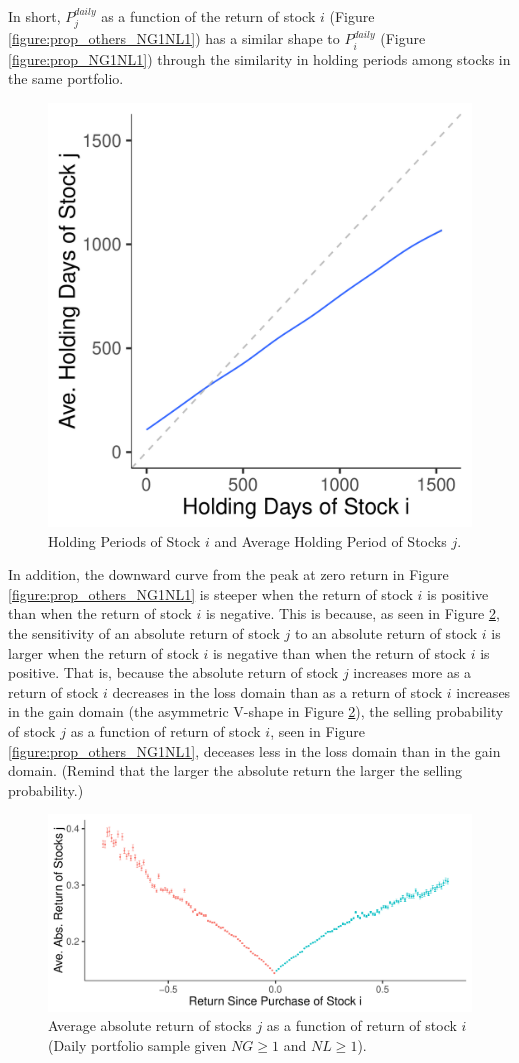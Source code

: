 \documentclass[11pt, a4paper]{article}
\begin{document}
In short, $P^{daily}_{j}$ as a function of the return of stock $i$ (Figure \ref{figure:prop_others_NG1NL1}) has a similar shape to $P^{daily}_{i}$ (Figure \ref{figure:prop_NG1NL1}) through the similarity in holding periods among stocks in the same portfolio. 

\begin{figure}[H]
	\centering
	\includegraphics[width=0.5\columnwidth]{barc_holding_days_i_j_NG1_NL1.pdf}
	\caption{Holding Periods of Stock $i$ and Average Holding Period of Stocks $j$.}
	\label{figure:holding_days_i_j_NG1NL1}
\end{figure}


In addition, the downward curve from the peak at zero return in Figure \ref{figure:prop_others_NG1NL1} is steeper when the return of stock $i$ is positive than when the return of stock $i$ is negative. This is because, as seen in Figure \ref{figure:ret_i_abs_j_NG1NL1}, the sensitivity of an absolute return of stock $j$ to an absolute return of stock $i$ is larger when the return of stock $i$ is negative than when the return of stock $i$ is positive. 
That is, because the absolute return of stock $j$ increases more as a return of stock $i$ decreases in the loss domain than as a return of stock $i$ increases in the gain domain (the asymmetric V-shape in Figure \ref{figure:ret_i_abs_j_NG1NL1}), the selling probability of stock $j$ as a function of return of stock $i$, seen in Figure \ref{figure:prop_others_NG1NL1}, deceases less in the loss domain than in the gain domain.
(Remind that the larger the absolute return the larger the selling probability.)  


\begin{figure}[H]
	\centering
	\includegraphics[width=0.8\columnwidth]{barc_R_i_abs_R_j_NG1_NL1.pdf}
	\caption{Average absolute return of stocks $j$ as a function of return of stock $i$ (Daily portfolio sample given $NG\geq1$ and $NL\geq1$).}
	\label{figure:ret_i_abs_j_NG1NL1}
\end{figure}
\end{document}
